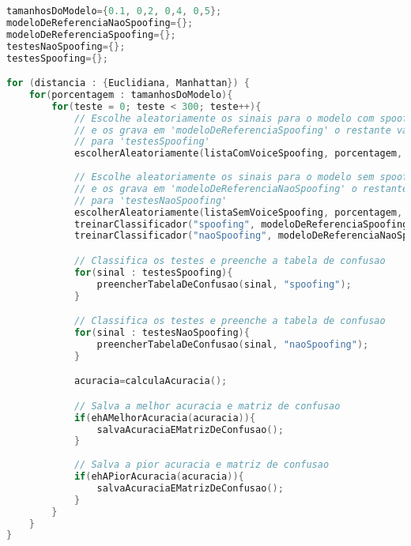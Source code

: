 \begin{lstlisting}[language=C++, caption={Algoritmo do experimento 2}, label={lst:experiment02Algo}]
tamanhosDoModelo={0.1, 0,2, 0,4, 0,5};
modeloDeReferenciaNaoSpoofing={};
modeloDeReferenciaSpoofing={};
testesNaoSpoofing={};
testesSpoofing={};

for (distancia : {Euclidiana, Manhattan}) {
	for(porcentagem : tamanhosDoModelo){
		for(teste = 0; teste < 300; teste++){
			// Escolhe aleatoriamente os sinais para o modelo com spoofing 
			// e os grava em 'modeloDeReferenciaSpoofing' o restante vai 
			// para 'testesSpoofing'
			escolherAleatoriamente(listaComVoiceSpoofing, porcentagem, modeloDeReferenciaSpoofing, testesSpoofing);
			
			// Escolhe aleatoriamente os sinais para o modelo sem spoofing
			// e os grava em 'modeloDeReferenciaNaoSpoofing' o restante vai 
			// para 'testesNaoSpoofing'
			escolherAleatoriamente(listaSemVoiceSpoofing, porcentagem, modeloDeReferenciaNaoSpoofing, testesNaoSpoofing);
			treinarClassificador("spoofing", modeloDeReferenciaSpoofing);
			treinarClassificador("naoSpoofing", modeloDeReferenciaNaoSpoofing);

			// Classifica os testes e preenche a tabela de confusao
			for(sinal : testesSpoofing){
				preencherTabelaDeConfusao(sinal, "spoofing");
			} 

			// Classifica os testes e preenche a tabela de confusao
			for(sinal : testesNaoSpoofing){
				preencherTabelaDeConfusao(sinal, "naoSpoofing");
			}

			acuracia=calculaAcuracia();

			// Salva a melhor acuracia e matriz de confusao
			if(ehAMelhorAcuracia(acuracia)){
				salvaAcuraciaEMatrizDeConfusao();
			}
			
			// Salva a pior acuracia e matriz de confusao
			if(ehAPiorAcuracia(acuracia)){
				salvaAcuraciaEMatrizDeConfusao();
			}
		}
	}
}				
\end{lstlisting}